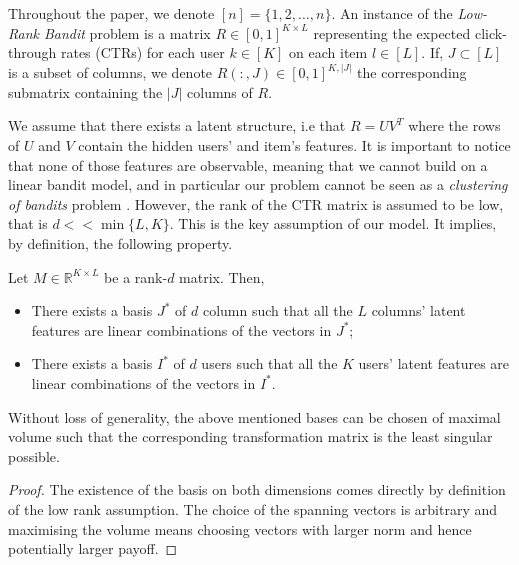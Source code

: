 
Throughout the paper, we denote $[n] = \lbrace 1,2,\ldots, n\rbrace$.
An instance of the \emph{Low-Rank Bandit} problem is a matrix
$R\in [0,1]^{K\times L}$ representing the expected click-through rates (CTRs) for each
user $k\in [K]$ on each item $l\in [L]$.
If, $J\subset [L]$ is a subset of columns, we denote $R(:,J)\in [0,1]^{K,|J|}$ the corresponding
submatrix containing the $|J|$ columns of $R$.

We assume that there exists a latent structure, i.e that $R=UV^T$ where the rows of
$U$ and $V$ contain the hidden users' and item's features.
It is important to notice that none of those features are observable, meaning that
we cannot build on a linear bandit model, and in particular
our problem cannot be seen as a \emph{clustering of bandits} problem \cite{gentile2014online}.
However, the rank of the CTR matrix is  assumed to be low, that is $d << \min\lbrace L,K\rbrace$.
This is the key assumption of our model.
It implies, by definition, the following property.

\begin{observation}
	Let $M\in \mathbb{R}^{K\times L}$ be a rank-$d$ matrix. Then,
	\begin{itemize}
		\item There exists a basis $J^*$ of $d$ column such that all the $L$ columns' latent features
		are linear combinations of the vectors in $J^*$;
		\item There exists a basis $I^*$ of $d$ users such that all the $K$ users' latent features
		are linear combinations of the vectors in $I^*$.
	\end{itemize}
	Without loss of generality, the above mentioned bases can be chosen of maximal volume such that
	the corresponding transformation matrix is the least singular possible.
\end{observation}
\begin{proof}
	The existence of the basis on both dimensions comes directly by definition of the
	low rank assumption. The choice of the spanning vectors is arbitrary and maximising the
	volume means choosing vectors with larger norm and hence potentially larger payoff.
\end{proof}

